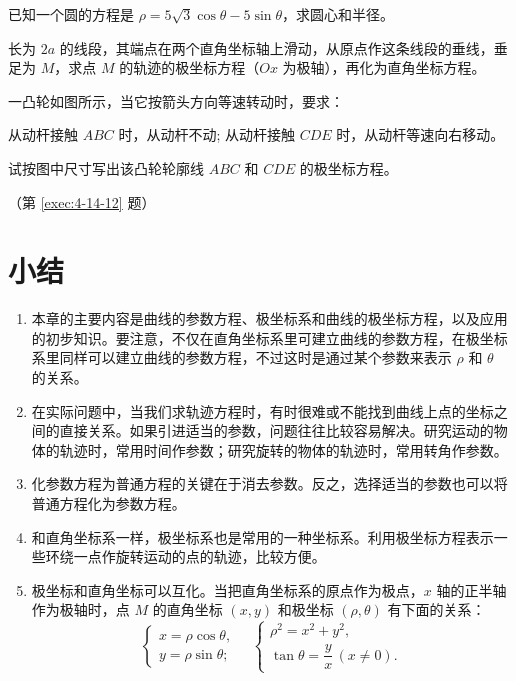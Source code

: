 \begin{Exercise}
\begin{question}
    \item 已知一个圆的方程是 $\rho=5\sqrt{3}\cos\theta-5\sin\theta$，求圆心和半径。
    \item 长为 $2a$ 的线段，其端点在两个直角坐标轴上滑动，从原点作这条线段的垂线，垂足为 $M$，求点 $M$ 的轨迹的极坐标方程（$Ox$ 为极轴），再化为直角坐标方程。
    \item\label{exec:4-14-12} 一凸轮如图所示，当它按箭头方向等速转动时，要求：
    \begin{tasks}
      \task 从动杆接触 $ABC$ 时，从动杆不动;
      \task 从动杆接触 $CDE$ 时，从动杆等速向右移动。
    \end{tasks}
    试按图中尺寸写出该凸轮轮廓线 $ABC$ 和 $CDE$ 的极坐标方程。
    \begin{figurehere}
      \begin{minipage}{\linewidth}\centering
        \caption*{（第 \ref{exec:4-14-12} 题）}
      \end{minipage}
    \end{figurehere}
  \end{question}
\end{Exercise}

\section*{小结}
\begin{enumerate}[C、,itemindent=4.5em]
  \item 本章的主要内容是曲线的参数方程、极坐标系和曲线的极坐标方程，以及应用的初步知识。要注意，不仅在直角坐标系里可建立曲线的参数方程，在极坐标系里同样可以建立曲线的参数方程，不过这时是通过某个参数来表示 $\rho$ 和 $\theta$ 的关系。
  \item 在实际问题中，当我们求轨迹方程时，有时很难或不能找到曲线上点的坐标之间的直接关系。如果引进适当的参数，问题往往比较容易解决。研究运动的物体的轨迹时，常用时间作参数；研究旋转的物体的轨迹时，常用转角作参数。
  \item 化参数方程为普通方程的关键在于消去参数。反之，选择适当的参数也可以将普通方程化为参数方程。
  \item 和直角坐标系一样，极坐标系也是常用的一种坐标系。利用极坐标方程表示一些环绕一点作旋转运动的点的轨迹，比较方便。
  \item 极坐标和直角坐标可以互化。当把直角坐标系的原点作为极点，$x$ 轴的正半轴作为极轴时，点 $M$ 的直角坐标 $(x,y)$ 和极坐标 $(\rho,\theta)$ 有下面的关系：
  \[\begin{cases} x=\rho\cos\theta,\\y=\rho\sin\theta; \end{cases} \quad \begin{cases} \rho^2=x^2+y^2,\\\tan\theta=\dfrac{y}{x}\,(x\neq 0). \end{cases} \]
\end{enumerate}
